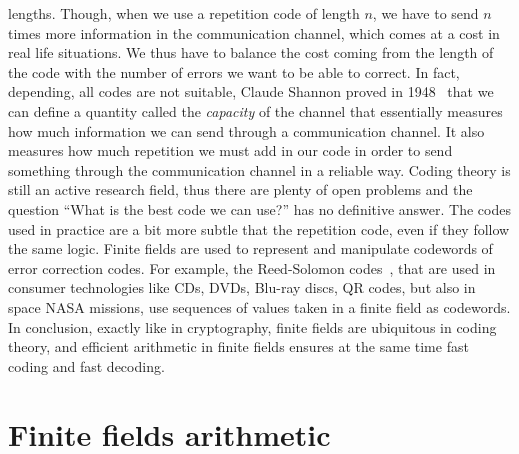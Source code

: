 lengths. Though, when we use a repetition code of length $n$, we have to send
$n$ times more information in the communication channel, which comes at a cost
in real life situations. We thus have to balance the cost coming from the length
of the code with the number of errors we want to be able to correct. In fact,
depending, all codes are not suitable, Claude Shannon proved in
1948~\cite{Shannon48} that we can define a quantity called the \emph{capacity}
of the channel that essentially measures how much information we can send
through a communication channel. It also measures how much repetition we
must add in our code in order to send something through the communication
channel in a reliable way. Coding theory is still an active research field, thus
there are plenty of open problems and the question ``What is the best code we
can use?'' has no definitive answer. The codes used in practice
are a bit more subtle that the repetition code, even if they follow the same
logic. Finite fields are used to represent and manipulate codewords of error
correction codes. For example, the Reed-Solomon codes~\cite{RS60}, that are used
in consumer technologies like CDs, DVDs, Blu-ray discs, QR codes, but also in
space NASA missions, use sequences of values taken in a finite field as
codewords. In conclusion, exactly like in cryptography, finite fields are
ubiquitous in coding theory, and efficient arithmetic in finite fields ensures
at the same time fast coding and fast decoding.

\section{Finite fields arithmetic}

